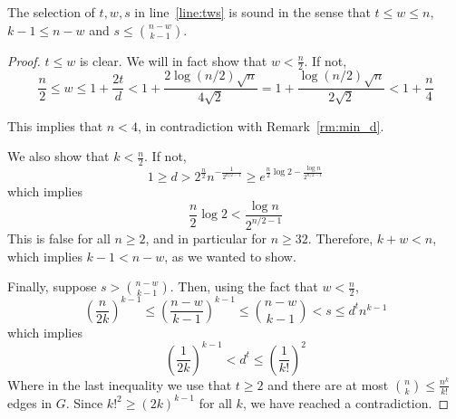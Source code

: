 \begin{lemma}\label{lm:sound}
    The selection of $t, w, s$ in line~\ref{line:tws} is sound in the sense that
    $t  \leq w \leq n$, $k - 1 \leq n - w$ and $s \leq \binom{n - w}{k - 1}$.
    \begin{proof}
        $t \leq w$ is clear.
        We will in fact show that $w < \frac{n}{2}$.
        If not,
        \[
            \frac{n}{2} \leq
            w \leq 1 + \frac{2t}{d} <
            1 + \frac{2 \log (n/2) \sqrt{n}}{4\sqrt{2}} =
            1 + \frac{\log(n/2) \sqrt{n}}{2\sqrt{2}} <
            1 + \frac{n}{4}
        \]

        This implies that $n < 4$, in contradiction with Remark~\ref{rm:min_d}.

        We also show that $k < \frac{n}{2}$.
        If not,
        \[
            1 \geq
            d >
            2^{\frac{n}{2}} n^{-\frac{1}{2^{n/2-1}}} \geq
            e^{\frac{n}{2} \log 2 - \frac{\log n}{2^{n/2-1}}}
        \]
        which implies
        \[
            \frac{n}{2} \log 2 < \frac{\log n}{2^{n/2-1}}
        \]
        This is false for all $n \geq 2$, and in particular for $n \geq 32$.
        Therefore, $ k + w < n$, which implies $k - 1 < n - w$,
        as we wanted to show.

        Finally, suppose $s > \binom{n - w}{k - 1}$.
        Then, using the fact that $w < \frac{n}{2}$,
        \[
            \left( \frac{n}{2k} \right)^{k-1} \leq
            \left( \frac{n-w}{k-1} \right)^{k-1} \leq
            \binom{n - w}{k - 1} < s \leq d^t n^{k-1}
        \]
        which implies
        \[
            \left( \frac{1}{2k} \right)^{k-1} < d^t \leq
            \left( \frac{1}{k!} \right)^2
        \]
        Where in the last inequality we use that $t \geq 2$ and there are at most
        $\binom{n}{k} \leq \frac{n^k}{k!}$ edges in $G$.
        Since $k!^2 \geq (2k)^{k-1}$ for all $k$,
        we have reached a contradiction. \qedhere

    \end{proof}
\end{lemma}


